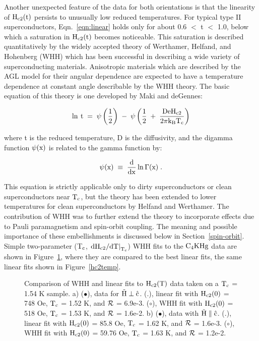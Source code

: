         Another unexpected feature of  the  data for both  orientations  is
that  the linearity of $\rm H_{c2}(t)$   persists to unusually  low reduced
temperatures.   For  typical type II superconductors, Eqn.~\ref{eqn:linear}
holds only  for about 0.6 $<$ t  $<$  1.0, below   which  a saturation  in $\rm
H_{c2}(t)$ becomes noticeable.  This saturation is described quantitatively
by    the widely accepted   theory  of   Werthamer,  Helfand, and Hohenberg
(WHH)\cite{werthamer66} which   has been successful   in describing  a wide
variety of superconducting materials\cite{orlando79,fetter69}.  Anisotropic
materials which are described by the AGL model for their angular dependence
are expected to have a temperature dependence at constant angle describable
by the WHH theory.  The basic  equation of this  theory is one developed by
Maki and deGennes\cite{saintjames69,helfand66}:

\begin{equation}
\rm \ln \: t \; = \; \psi\left(\frac{1}{2}\right) \; - \; \psi\left(
\frac{1}{2} \; + \; \frac{D e H_{c2}}{2 \pi k_B T_c}  \right)
\label{makidegennes}
\end{equation}

\noindent where t is the reduced temperature, D is the diffusivity, and 
the digamma function $\rm \psi(x)$ is related to the gamma function by:

\[ \rm \psi (x) \; \equiv \; \frac{d}{dx} \ln \Gamma(x) \; .
\]

This equation is strictly applicable only to dirty superconductors or clean
superconductors near $\rm T_c$, but the  theory has  been extended to lower
temperatures       for       clean  superconductors       by    Helfand and
Werthamer\cite{helfand66}.    The
contribution of WHH\cite{werthamer66} was  to further extend  the theory to
incorporate effects due  to  Pauli  paramagnetism and spin-orbit  coupling.
The meaning and possible importance  of  these embellishments is  discussed
below in Section~\ref{spin-orbit}.  Simple two-parameter ($\rm T_c$, $\rm
\left.  dH_{c2}/dT \right|_{T_c}$) WHH  fits to  the $\rm C_4KHg$  data are
shown in  Figure~\ref{whhfit}, where they are compared  to the  best linear
fits, the same linear fits shown in Figure~\ref{hc2temp}.
        
\begin{figure}
\vspace{16cm}
\caption[Comparison of WHH and linear fits to $\rm H_{c2}(T)$ data taken on a $
\rm T_c$ = 1.54 K sample.]{Comparison of WHH and linear fits to $\rm H_{c2}(T)$
data taken  on a $\rm T_c$  = 1.54 K sample.  a) ($\bullet$), data for $\rm
\vec{H} \perp \hat{c}$.  (.), linear fit with $\rm H_{c2}(0)$ = 748 Oe, $\rm
T_c$  =  1.52 K,  and $\cal R$   = 6.9e-3.  ($\circ$),   WHH fit  with $\rm
H_{c2}(0)$ =  518 Oe,  $\rm T_c$  = 1.53 K,  and  $\cal R$ =  1.6e-2. b)
($\bullet$), data with $\rm  \vec{H}  \parallel \hat{c}$.  (.),  linear fit
with  $\rm H_{c2}(0)$  = 85.8 Oe,  $\rm  T_c$ = 1.62  K, and  $\cal R$ =
1.6e-3.  ($\circ$), WHH fit with $\rm H_{c2}(0)$ = 59.76 Oe, $\rm T_c$ =
1.63 K, and $\cal R$ = 1.2e-2.}
\label{whhfit}
\end{figure}

